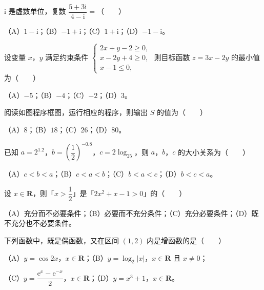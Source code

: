

\begin{question}
$\mathrm i$ 是虚数单位，复数 $\dfrac{5+3\mathrm i}{4-\mathrm i}=$\mbox{（　　）}

（A）$1-\mathrm i$；（B）$-1+\mathrm i$；（C）$1+\mathrm i$；（D）$-1-\mathrm i$。

\end{question}
\begin{question}
设变量 $x$，$y$ 满足约束条件 $\begin{cases}2x+y-2\geqslant0,\\ x-2y+4\geqslant0,\\ x-1\leqslant0,\end{cases}$ 则目标函数 $z=3x-2y$ 的最小值为\mbox{（　　）}

（A）$-5$；（B）$-4$；（C）$-2$；（D）$3$。

\Needspace{0.4\textheight}
\end{question}
\begin{question}
阅读如图程序框图，运行相应的程序，则输出 $S$ 的值为\mbox{（　　）}
\nopagebreak[4]
\begin{center}\end{center}
\nopagebreak[4]
（A）$8$；（B）$18$；（C）$26$；（D）$80$。

\end{question}
\begin{question}
已知 $a=2^{1.2}$，$b=\left(\dfrac12\right)^{-0.8}$，$c=2\log_25$，则 $a$，$b$，$c$ 的大小关系为\mbox{（　　）}

（A）$c<b<a$；（B）$c<a<b$；（C）$b<a<c$；（D）$b<c<a$。

\end{question}
\begin{question}
设 $x\in\mathbf R$，则「$x>\dfrac12$」是「$2x^2+x-1>0$」的\mbox{（　　）}

（A）充分而不必要条件；（B）必要而不充分条件；（C）充分必要条件；（D）既不充分也不必要条件。

\end{question}
\begin{question}
下列函数中，既是偶函数，又在区间 $(1,2)$ 内是增函数的是\mbox{（　　）}

（A）$y=\cos2x$，$x\in\mathbf R$；（B）$y=\log_2|x|$，$x\in\mathbf R$ 且 $x\neq0$；

（C）$y=\dfrac{\mathrm e^x-\mathrm e^{-x}}2$，$x\in\mathbf R$；（D）$y=x^3+1$，$x\in\mathbf R$。

\end{question}

